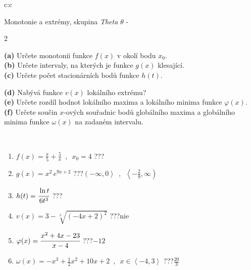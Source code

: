 \documentclass[10pt]{report}
\begin{document}
\newpage
\thispagestyle{empty}
\begin{tabular}{c:c}
\begin{minipage}[c][104.5mm][t]{0.5\linewidth}
\begin{center}
\vspace{7mm}
{\huge Monotonie a extrémy, skupina \textit{Theta $\theta$} -}\\[5mm]
\begin{minipage}{0.95\linewidth}
\begin{center}
{\small \begin{multicols}{2} \raggedright
\textbf{(a)} Určete monotonii funkce \(f(x)\) v okolí bodu \(x_0\). \\[1mm]
\textbf{(b)} Určete intervaly, na kterých je funkce \(g(x)\) klesající. \\[1mm]
\textbf{(c)} Určete počet stacionárních bodů funkce \(h(t)\). \par \columnbreak
\textbf{(d)} Nabývá funkce \(v(x)\) lokálního extrému? \\[1mm]
\textbf{(e)} Určete rozdíl hodnot lokálního maxima a lokálního minima funkce \(\varphi(x)\). \\[1mm]
\textbf{(f)} Určete součin \(x\)-ových souřadnic bodů globálního maxima a globálního minima funkce \(\omega(x)\) na zadaném intervalu. \\[1mm]
\end{multicols}
}
\end{center}
\end{minipage}
\\[4mm]
\begin{minipage}{0.79\linewidth}
\begin{center}
\begin{varwidth}{\linewidth}
\begin{enumerate}
\normalsize
\item $f(x)=\frac{x}{5}+\frac{5}{x} \enspace , \enspace x_0=4$\quad \dotfill\; ???\;\dotfill \quad {}
\item $g(x)=x^2\, e^{9x+2}$\quad \dotfill\; ???\;\dotfill \quad $\left(-\infty , 0\right\rangle\enspace , \enspace \left\langle-\frac{2}{9} , \infty\right)$
\item $h(t)=\cfrac{\ln t}{6t^3}$\quad \dotfill\; ???\;\dotfill {}
\item $v(x)=3-\sqrt[5]{(-4x+2)^2}$\quad \dotfill\; ???\;\dotfill \quad $\text{nie}$
\item $\varphi(x)=\cfrac{x^2+4x-23}{x-4}$\quad \dotfill\; ???\;\dotfill \quad $-12$
\item $\omega(x)=-x^3+\frac{1}{2}x^2+10x+2 \enspace , \enspace x\in\left\langle-4 , 3\right\rangle$\quad \dotfill\; ???\;\dotfill \quad $\frac{20}{3}$

\end{enumerate}
\end{varwidth}
\end{center}
\end{minipage}
\end{center}
\end{minipage}
\end{tabular}
\end{document}
